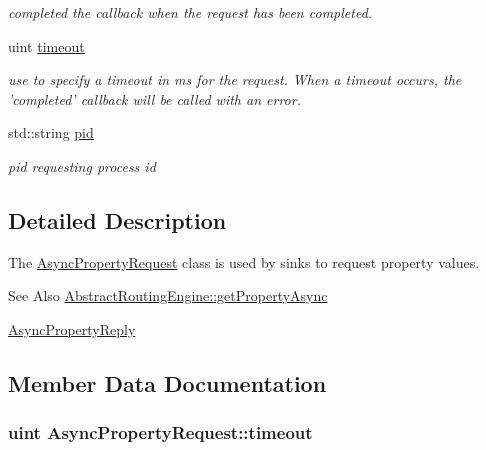 \begin{DoxyCompactItemize}
\begin{DoxyCompactList}\small\item\em completed the callback when the request has been completed. \end{DoxyCompactList}\item 
uint \hyperlink{classAsyncPropertyRequest_a449da60204ce7c13462be179f869105c}{timeout}
\begin{DoxyCompactList}\small\item\em use to specify a timeout in ms for the request. When a timeout occurs, the 'completed' callback will be called with an error. \end{DoxyCompactList}\item 
\hypertarget{classAsyncPropertyRequest_abaa035426c3ac48fe53de273b1a60eba}{std\-::string \hyperlink{classAsyncPropertyRequest_abaa035426c3ac48fe53de273b1a60eba}{pid}}\label{classAsyncPropertyRequest_abaa035426c3ac48fe53de273b1a60eba}

\begin{DoxyCompactList}\small\item\em pid requesting process id \end{DoxyCompactList}\end{DoxyCompactItemize}


\subsection{Detailed Description}
The \hyperlink{classAsyncPropertyRequest}{Async\-Property\-Request} class is used by sinks to request property values. 

\begin{DoxySeeAlso}{See Also}
\hyperlink{classAbstractRoutingEngine_ad1cbda415f674be4a3ce49be05aa8ee8}{Abstract\-Routing\-Engine\-::get\-Property\-Async} 

\hyperlink{classAsyncPropertyReply}{Async\-Property\-Reply} 
\end{DoxySeeAlso}


\subsection{Member Data Documentation}
\hypertarget{classAsyncPropertyRequest_a449da60204ce7c13462be179f869105c}{
\subsubsection[{timeout}]{\setlength{\rightskip}{0pt plus 5cm}uint Async\-Property\-Request\-::timeout}}\label{classAsyncPropertyRequest_a449da60204ce7c13462be179f869105c}


